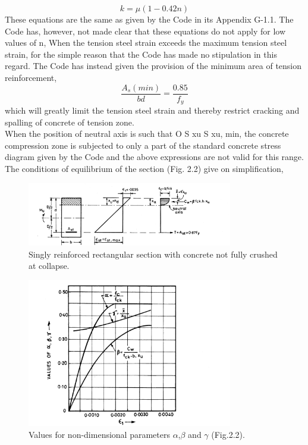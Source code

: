 \begin{equation}
k=\mu(1-0.42n)
\end{equation}
These equations are the same as given by the Code in its Appendix G-1.1. The Code has,
however, not made clear that these equations do not apply for low values of n, When the tension
steel strain exceeds the maximum tension steel strain, for the simple reason that the Code
has made no stipulation in this regard. The Code has instead given the provision of the
minimum area of tension reinforcement,
\begin{equation*}
\frac{A_s(min)}{bd} = \frac{0.85}{f_y}
\end{equation*}
which will greatly limit the tension steel strain and thereby restrict cracking and spalling of
concrete of tension zone.\\
When the position of neutral axis is such that O S xu S xu, min, the concrete compression
zone is subjected to only a part of the standard concrete stress diagram given by the Code and
the above expressions are not valid for this range. The conditions of equilibrium of the section
(Fig. 2.2) give on simpliﬁcation,
\begin{figure}
\centering
\includegraphics[width=0.8\textwidth]{images/ch2-2.png}
\caption{Singly reinforced rectangular section with concrete not fully crushed at collapse.}
\label{fig:Singly reinforced section}
\end{figure}
\begin{figure}
\centering
\includegraphics[width=0.8\textwidth]{images/ch2-3.png}
\caption{Values for non-dimensional parameters ${\alpha}$,${\beta}$ and ${\gamma}$ (Fig.2.2).}
\label{fig:Values for parameters}
\end{figure}
